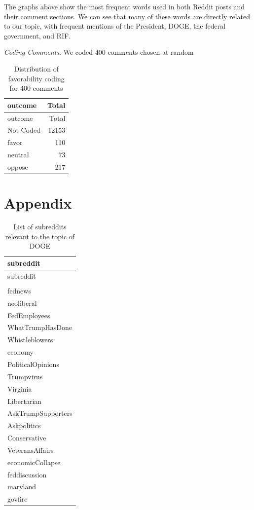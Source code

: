 \documentclass[
  12pt]{article}
\begin{document}
The graphs above show the most frequent words used in both Reddit posts
and their comment sections. We can see that many of these words are
directly related to our topic, with frequent mentions of the President,
DOGE, the federal government, and RIF.

\emph{Coding Comments}. We coded 400 comments chosen at random

\begin{longtable}[]{@{}lr@{}}
\caption{Distribution of favorability coding for 400
comments}\tabularnewline
\toprule\noalign{}
outcome & Total \\
\midrule\noalign{}
\endfirsthead
\toprule\noalign{}
outcome & Total \\
\midrule\noalign{}
\endhead
\bottomrule\noalign{}
\endlastfoot
Not Coded & 12153 \\
favor & 110 \\
neutral & 73 \\
oppose & 217 \\
\end{longtable}

\newpage

\section{Appendix}\label{appendix}

\begin{longtable}[]{@{}l@{}}
\caption{List of subreddits relevant to the topic of
DOGE}\tabularnewline
\toprule\noalign{}
subreddit \\
\midrule\noalign{}
\endfirsthead
\toprule\noalign{}
subreddit \\
\midrule\noalign{}
\endhead
\bottomrule\noalign{}
\endlastfoot
50501 \\
fednews \\
neoliberal \\
FedEmployees \\
WhatTrumpHasDone \\
Whistleblowers \\
economy \\
PoliticalOpinions \\
Trumpvirus \\
Virginia \\
Libertarian \\
AskTrumpSupporters \\
Askpolitics \\
Conservative \\
VeteransAffairs \\
economicCollapse \\
feddiscussion \\
maryland \\
govfire \\
\end{longtable}
\end{document}
